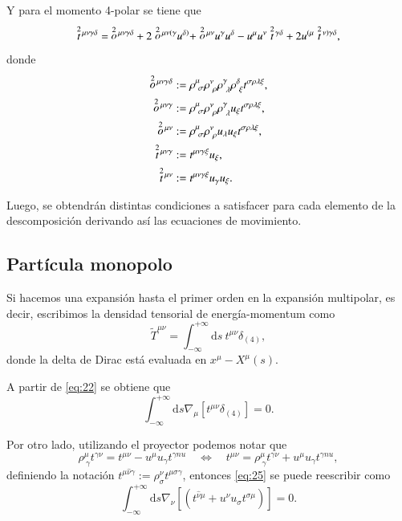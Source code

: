 Y para el momento 4-polar se tiene que
\begin{equation}
\des{2}{t}^{\mu \nu \gamma \delta} = \ \des{2}{o}^{\mu \nu \gamma \delta} + 2 \des{2}{o}^{\mu \nu (\gamma} u^{\delta)} + \des{2}{o}^{\mu \nu} u^{\gamma} u^{\delta} - u^{\mu} u^{\nu} \des{2}{t}^{\gamma \delta} + 2 u^{(\mu} \des{2}{t}^{\nu) \gamma \delta},
\end{equation}
donde
\begin{align*}
\des{2}{o}^{\mu \nu \gamma \delta} &:= \rho^{\mu}_{\ \sigma} \rho^{\nu}_{\ \rho} \rho^{\gamma}_{\ \lambda} \rho^{\delta}_{\ \xi} t^{\sigma \rho \lambda \xi},\\
\des{2}{o}^{\mu \nu \gamma} &:= \rho^{\mu}_{\ \sigma} \rho^{\nu}_{\ \rho} \rho^{\gamma}_{\ \lambda} u_{\xi} t^{\sigma \rho \lambda \xi},\\
\des{2}{o}^{\mu \nu} &:= \rho^{\mu}_{\ \sigma} \rho^{\nu}_{\ \rho} u_{\lambda} u_{\xi} t^{\sigma \rho \lambda \xi},\\
\des{2}{t}^{\mu \nu \gamma} &:= t^{\mu \nu \gamma \xi} u_{\xi},\\
 \des{2}{t}^{\mu \nu} &:= t^{\mu \nu \gamma \xi} u_{\gamma} u_{\xi}.
\end{align*}

Luego, se obtendrán distintas condiciones a satisfacer para cada elemento de la descomposición derivando así las ecuaciones de movimiento.

\subsection{Partícula monopolo}

Si hacemos una expansión hasta el primer orden en la expansión multipolar, es decir, escribimos la densidad tensorial de energía-momentum como
\begin{equation}
\tilde{T}^{\mu \nu} = \int_{-\infty}^{+\infty} \mathrm{d}s \ t^{\mu \nu} \delta_{(4)},
\end{equation}
donde la delta de Dirac está evaluada en $x^{\mu} - X^{\mu}(s)$.

A partir de \eqref{eq:22} se obtiene que
\begin{equation}
\label{eq:25}
\int_{-\infty}^{+\infty} \mathrm{d}s \nabla_{\mu} [ t^{\mu \nu} \delta_{(4)}] = 0.
\end{equation}

Por otro lado, utilizando el proyector podemos notar que
\begin{equation}
\rho^{\mu}_{\ \gamma} t^{\gamma \nu} = t^{\mu \nu} - u^{\mu} u_{\gamma} t^{\gamma nu}
\quad \Longleftrightarrow \quad t^{\mu \nu} = \rho^{\mu}_{\ \gamma} t^{\gamma \nu} + u^{\mu} u_{\gamma} t^{\gamma nu},
\end{equation}
definiendo la notación $t^{\mu \hat{\nu} \gamma} := \rho^{\nu}_{\sigma} t^{\mu \sigma \gamma} $, entonces  \eqref{eq:25} se puede reescribir como
\begin{equation}
\label{eq:26}
\int_{-\infty}^{+\infty} \mathrm{d}s \nabla_{\nu} [(t^{\hat{\nu} \mu} + u^{\nu} u_{\sigma} t^{\sigma \mu} )] = 0.
\end{equation}


